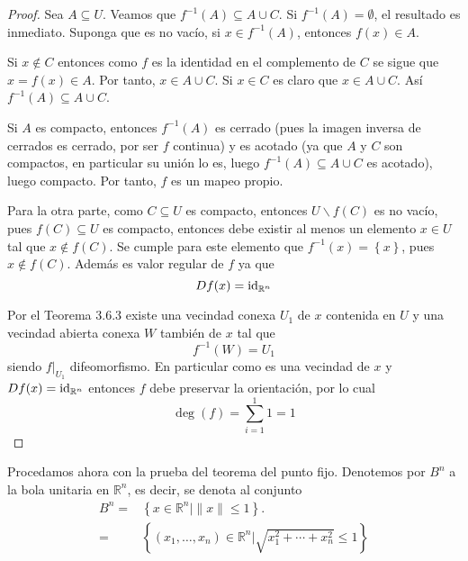 \documentclass[12pt]{report}
\theoremstyle{largebreak}
\begin{document}
\begin{proof}
    Sea $A\subseteq U$. Veamos que $f^{-1}(A)\subseteq A\cup C$. Si $f^{-1}(A)=\emptyset$, el resultado es inmediato. Suponga que es no vacío, si $x\in f^{-1}(A)$, entonces $f(x)\in A$.

    Si $x\notin C$ entonces como $f$ es la identidad en el complemento de $C$ se sigue que $x = f(x)\in A$. Por tanto, $x\in A\cup C$. Si $x\in C$ es claro que $x\in A\cup C$.
    Así $f^{-1}(A)\subseteq A\cup C$.

    Si $A$ es compacto, entonces $f^{-1}(A)$ es cerrado (pues la imagen inversa de cerrados es cerrado, por ser $f$ continua) y es acotado (ya que $A$ y $C$ son compactos, en particular su unión lo es, luego $f^{-1}(A)\subseteq A\cup C$ es acotado), luego compacto. Por tanto, $f$ es un mapeo propio.
    
    Para la otra parte, como $C\subseteq U$ es compacto, entonces $U\backslash f(C)$ es no vacío, pues $f(C)\subseteq U$ es compacto, entonces debe existir al menos un elemento $x\in U$ tal que $x\notin f(C)$. Se cumple para este elemento que $f^{-1}(x)=\left\{x\right\}$, pues $x\notin f(C)$. Además es valor regular de $f$ ya que
    \begin{equation*}
        Df(x)=\textup{id}_{\mathbb{R}^n}
    \end{equation*}
    
    Por el Teorema 3.6.3 existe una vecindad conexa $U_1$ de $x$ contenida en $U$ y una vecindad abierta conexa $W$ también de $x$ tal que
    \begin{equation*}
        f^{-1}(W)=U_1
    \end{equation*}
    siendo $f|_{U_1}$ difeomorfismo. En particular como es una vecindad de $x$ y $Df(x)=\textup{id}_{\mathbb{R}^n}$ entonces $f$ debe preservar la orientación, por lo cual
    \begin{equation*}
        \deg(f)=\sum_{i=1}^{1}1=1
    \end{equation*}
\end{proof}

Procedamos ahora con la prueba del teorema del punto fijo. Denotemos por $B^n$ a la bola unitaria en $\mathbb{R}^n$, es decir, se denota al conjunto
\begin{equation*}
    \begin{split}
        B^n=&\left\{x\in\mathbb{R}^n|\|x\|\leq 1\right\}.\\
        =&\left\{(x_1,\dots,x_n)\in\mathbb{R}^n|\sqrt{x_1^2+\cdots+x_n^2}\leq1\right\}
    \end{split}
\end{equation*}
\end{document}
